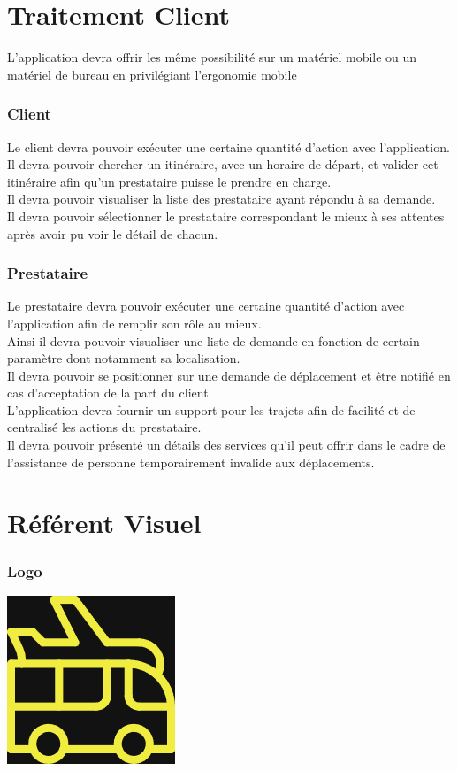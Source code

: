\documentclass[a4paper,12pt]{article}
\begin{document}
\newpage
\part{Traitement Client}

L'application devra offrir les même possibilité sur un matériel mobile ou un matériel de bureau en privilégiant l'ergonomie mobile 

\section{Client}
Le client devra pouvoir exécuter une certaine quantité d'action avec l'application.\\
Il devra pouvoir chercher un itinéraire, avec un horaire de départ, et valider cet itinéraire afin qu'un prestataire puisse le prendre en charge.\\
Il devra pouvoir visualiser la liste des prestataire ayant répondu à sa demande.\\
Il devra pouvoir sélectionner le prestataire correspondant le mieux à ses attentes après avoir pu voir le détail de chacun.\\

\section{Prestataire}
Le prestataire devra pouvoir exécuter une certaine quantité d'action avec l'application afin de remplir son rôle au mieux.\\
Ainsi il devra pouvoir visualiser une liste de demande en fonction de certain paramètre dont notamment sa localisation.\\
Il devra pouvoir se positionner sur une demande de déplacement et être notifié en cas d'acceptation de la part du client.\\
L'application devra fournir un support pour les trajets afin de facilité et de centralisé les actions du prestataire.\\
Il devra pouvoir présenté un détails des services qu'il peut offrir dans le cadre de l'assistance de personne temporairement invalide aux déplacements.

\newpage
\part{Référent Visuel}

\section{Logo}
\includegraphics{sujet1.png}
\end{document}
